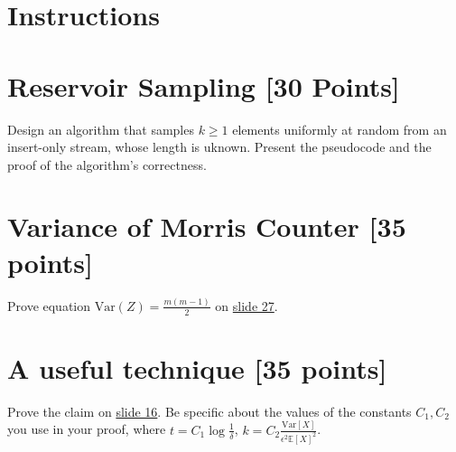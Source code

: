 \usepackage{url}
\usepackage{amsmath,amssymb,amsthm}
\usepackage{hyperref}

\newcommand{\Prob}[1]{{{\bf{Pr}}\left[{#1}\right]}}
\newcommand{\Mean}[1]{{\mathbb E}\left[{#1}\right]}
\newcommand{\Var}[1]{{\mathbb Var}\left[{#1}\right]}






\section*{Instructions}

\section{Reservoir Sampling [30 Points]} 

Design an algorithm that samples  $k \geq 1$ elements uniformly at random  from an insert-only stream, whose length is uknown. Present the pseudocode and the proof of the algorithm's correctness.

\section{Variance of Morris Counter [35 points]} 

Prove equation $\text{Var}(Z)=\frac{m(m-1)}{2}$ on \href{https://tinyurl.com/2p84tftt}{slide 27}.

\section{A useful technique  [35 points]} 

Prove the claim on \href{https://tinyurl.com/putc3vw2}{slide 16}.  Be specific about the values of the constants $C_1, C_2$ you use in your proof, where $t=C_1 \log \frac{1}{\delta}$, $k=C_2 \frac{\text{Var}[X]}{\epsilon^2 \mathbb{E}[X]^2}$.
 

